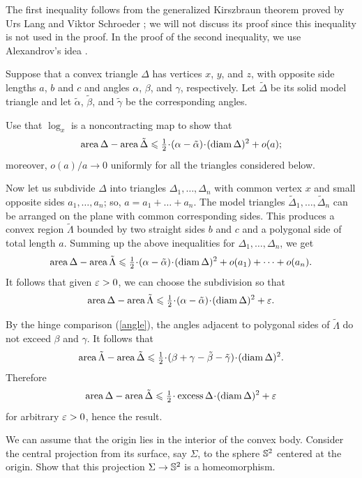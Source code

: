 The first inequality follows from the generalized Kirszbraun theorem proved by Urs Lang and Viktor Schroeder \cite{lang-schroeder:kirszbraun, alexander-kapovitch-kirszbraun, alexander-kapovitch-petrunin2024};
we will not discuss its proof since this inequality is not used in the proof.
In the proof of the second inequality, we use Alexandrov's idea \cite[X §~1]{alexandrov-1948}.

Suppose that a convex triangle $\Delta$ has vertices $x$, $y$, and $z$, with opposite side lengths $a$, $b$ and $c$ and angles $\alpha$, $\beta$, and $\gamma$, respectively.
Let $\tilde\Delta$ be its solid model triangle and let $\tilde \alpha$, $\tilde \beta$, and $\tilde \gamma$ be the corresponding angles.

Use that $\log_x$ is a noncontracting map to show that
\[\area\Delta-\area\tilde\Delta\le \tfrac12\cdot(\alpha-\tilde\alpha)\cdot (\diam \Delta)^2+o(a);\]
moreover, $o(a)/a\to0$ uniformly for all the triangles considered below.

Now let us subdivide $\Delta$ into triangles $\Delta_1,\dots,\Delta_n$ with common vertex $x$ and small opposite sides $a_1,\dots,a_n$; so, $a=a_1+\dots+a_n$.
The model triangles $\tilde\Delta_1,\dots,\tilde\Delta_n$ can be arranged on the plane with common corresponding sides.
This produces a convex region $\tilde\Lambda$ bounded by two straight sides $b$ and $c$ and a polygonal side of total length $a$.
Summing up the above inequalities for $\Delta_1,\dots,\Delta_n$, we get
\[\area\Delta-\area\tilde\Lambda\le \tfrac12\cdot(\alpha-\tilde\alpha)\cdot (\diam\Delta)^2+o(a_1)+\dots +o(a_n).\]
It follows that given $\varepsilon>0$, we can choose the subdivision so that
\[\area\Delta-\area\tilde\Lambda\le \tfrac12\cdot(\alpha-\tilde\alpha)\cdot (\diam\Delta)^2+\eps.\]

By the hinge comparison (\ref{angle}), the angles adjacent to polygonal sides of $\tilde\Lambda$ do not exceed $\beta$ and $\gamma$.
It follows that
\[\area\tilde\Lambda-\area\tilde\Delta\le \tfrac12\cdot(\beta+\gamma-\tilde\beta-\tilde\gamma)\cdot (\diam \Delta)^2.\]
Therefore
\[\area\Delta-\area\tilde\Delta\le \tfrac12\cdot\excess\Delta\cdot (\diam \Delta)^2+\eps\]
for arbitrary $\varepsilon>0$, hence the result.



We can assume that the origin lies in the interior of the convex body.
Consider the central projection from its surface, say $\Sigma$, to the sphere $\mathbb{S}^2$ centered at the origin.
Show that this projection $\Sigma\to \mathbb{S}^2$ is a homeomorphism.

